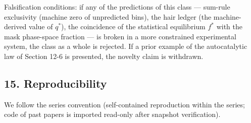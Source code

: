\documentclass[
  a4paper,
]{article}
\begin{document}
Falsification conditions: if any of the predictions of this class ---
sum-rule exclusivity (machine zero of unpredicted bins), the hair ledger
(the machine-derived value of \(q^*\)), the coincidence of the
statistical equilibrium \(f^*\) with the mask phase-space fraction ---
is broken in a more constrained experimental system, the class as a
whole is rejected. If a prior example of the autocatalytic law of
Section 12-6 is presented, the novelty claim is withdrawn.

\subsection{15. Reproducibility}\label{reproducibility}

We follow the series convention (self-contained reproduction within the
series; code of past papers is imported read-only after snapshot
verification).
\end{document}
